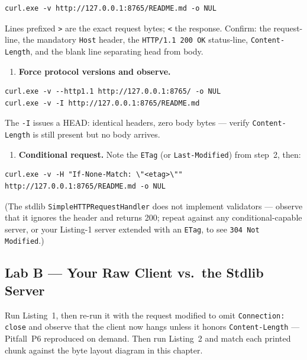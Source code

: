 \begin{verbatim}
curl.exe -v http://127.0.0.1:8765/README.md -o NUL
\end{verbatim}

Lines prefixed \texttt{>} are the exact request bytes; \texttt{<} the response. Confirm: the request-line, the mandatory \texttt{Host} header, the \texttt{HTTP/1.1 200 OK} status-line, \texttt{Content-Length}, and the blank line separating head from body.

\begin{enumerate}[resume]
  \item \textbf{Force protocol versions and observe.}
\end{enumerate}

\begin{verbatim}
curl.exe -v --http1.1 http://127.0.0.1:8765/ -o NUL
curl.exe -v -I http://127.0.0.1:8765/README.md
\end{verbatim}

The \texttt{-I} issues a HEAD: identical headers, zero body bytes --- verify \texttt{Content-Length} is still present but no body arrives.

\begin{enumerate}[resume]
  \item \textbf{Conditional request.} Note the \texttt{ETag} (or \texttt{Last-Modified}) from step~2, then:
\end{enumerate}

\begin{verbatim}
curl.exe -v -H "If-None-Match: \"<etag>\"" http://127.0.0.1:8765/README.md -o NUL
\end{verbatim}

(The stdlib \texttt{SimpleHTTPRequestHandler} does not implement validators --- observe that it ignores the header and returns 200; repeat against any conditional-capable server, or your Listing-1 server extended with an \texttt{ETag}, to see \texttt{304 Not Modified}.)

\subsection{Lab B --- Your Raw Client vs.\ the Stdlib Server}

Run Listing~1, then re-run it with the request modified to omit \texttt{Connection: close} and observe that the client now hangs unless it honors \texttt{Content-Length} --- Pitfall~P6 reproduced on demand. Then run Listing~2 and match each printed chunk against the byte layout diagram in this chapter.

